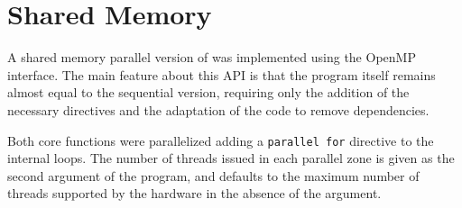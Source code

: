 \section{Shared Memory}

A shared memory parallel version of \polu was implemented using the OpenMP interface. The main feature about this API is that the program itself remains almost equal to the sequential version, requiring only the addition of the necessary directives and the adaptation of the code to remove dependencies.

Both core functions were parallelized adding a \texttt{parallel for} directive to the internal loops. The number of threads issued in each parallel zone is given as the second argument of the program, and defaults to the maximum number of threads supported by the hardware in the absence of the argument.


